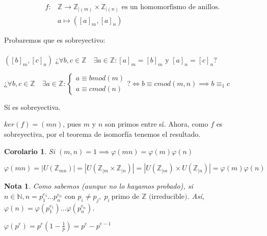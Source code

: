 \documentclass[11pt, a4paper, titlepage]{article}
\makeatletter
\renewenvironment{proof}[1][\proofname] {\vspace{-15pt}\par\pushQED{\qed}\normalfont\topsep6\p@\@plus6\p@\relax\trivlist\item[\hskip\labelsep\it#1\@addpunct{.}]\ignorespaces}{\popQED\endtrivlist\@endpefalse}
\theoremstyle{theorem-style}
\newtheorem{ncor}{Corolario}
\theoremstyle{definition-style}
\theoremstyle{remark-style}
\newtheorem*{nota}{Nota}
\theoremstyle{example-style}
\makeatother
\begin{document}
\begin{proof}
\begin{align*}
f:& \mathbb{Z} \longrightarrow \mathbb{Z}_{|(m)}\times \mathbb{Z}_{|(n)}\text{ es un homomorfismo de anillos.}\\
& a \longmapsto ([a]_m, [a]_n)
\end{align*}

Probaremos que es sobreyectivo:\\\\
$([b]_m,[c]_n)$ ¿$\forall b,c \in \mathbb{Z}\quad \exists a \in \mathbb{Z} : [a]_m = [b]_m \text{ y } [a]_n = [c]_n$?

¿$\forall b,c \in \mathbb{Z}\quad \exists a \in \mathbb{Z} : \begin{cases}
  a \equiv b mod(m)\\
  a \equiv c mod(n)
\end{cases}$?$ \iff b \equiv c mod(m,n) \implies b \equiv_1 c$

Sí es sobreyectiva.

$ker(f) = (mn)$, pues $m$ y $n$ son primos entre sí. Ahora, como $f$ es sobreyectiva, por el teorema de isomorfía tenemos el resultado.
\end{proof}

\begin{ncor}
  Si $(m,n) = 1 \implies \varphi(mn) = \varphi(m)\varphi(n)$
\end{ncor}

\begin{proof}
  $\varphi(mn) = |U(\mathbb{Z}_{mn})| = |U(\mathbb{Z}_{|m}\times\mathbb{Z}_{|n})| = |U(\mathbb{Z}_{|m}) \times U(\mathbb{Z}_{|n})| = \varphi(m)\varphi(n)$
\end{proof}
\begin{nota}
  Como sabemos (aunque no lo hayamos probado), si $n\in \mathbb{N}, n= p_1^{e_1}\dots p_n^{e_n} \text{ con } p_i \ne p_j,\; p_i\ \text{primo de $\mathbb{Z}$ (irreducible)}$. Así, $\varphi(n) = \varphi(p_1^{e_1})\dots\varphi(p_n^{e_n})$.
  
  $\varphi(p^e) = p^e(1-\frac{1}{p}) = p^e-p^{e-1}$
\end{nota}
\end{document}
